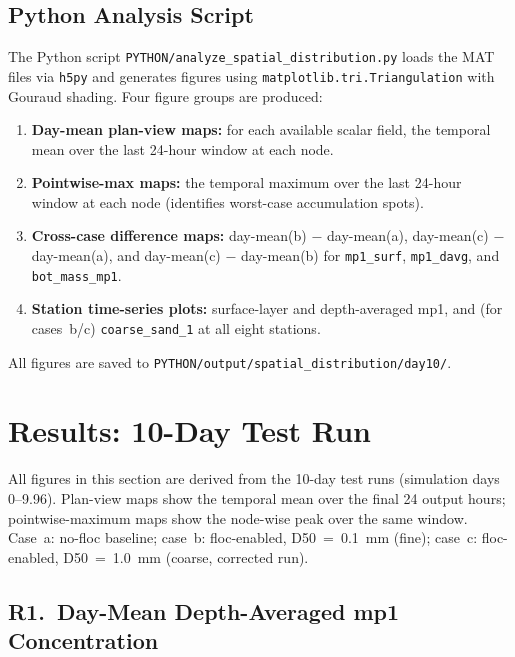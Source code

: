 \documentclass[11pt]{article}
\begin{document}
\subsection*{Python Analysis Script}

The Python script \texttt{PYTHON/analyze\_spatial\_distribution.py} loads
the MAT files via \texttt{h5py} and generates figures using
\texttt{matplotlib.tri.Triangulation} with Gouraud shading.  Four figure
groups are produced:

\begin{enumerate}[(1)]
  \item \textbf{Day-mean plan-view maps:} for each available scalar field,
        the temporal mean over the last 24-hour window at each node.
  \item \textbf{Pointwise-max maps:} the temporal maximum over the last
        24-hour window at each node (identifies worst-case accumulation spots).
  \item \textbf{Cross-case difference maps:} day-mean(b) $-$ day-mean(a),
        day-mean(c) $-$ day-mean(a), and day-mean(c) $-$ day-mean(b) for
        \texttt{mp1\_surf}, \texttt{mp1\_davg}, and \texttt{bot\_mass\_mp1}.
  \item \textbf{Station time-series plots:} surface-layer and depth-averaged
        mp1, and (for cases~b/c) \texttt{coarse\_sand\_1} at all eight stations.
\end{enumerate}

All figures are saved to \texttt{PYTHON/output/spatial\_distribution/day10/}.

\section*{Results: 10-Day Test Run}

All figures in this section are derived from the 10-day test runs
(simulation days 0--9.96).  Plan-view maps show the temporal mean
over the final 24 output hours; pointwise-maximum maps show the
node-wise peak over the same window.
Case~a: no-floc baseline; case~b: floc-enabled, D50~=~0.1~mm (fine);
case~c: floc-enabled, D50~=~1.0~mm (coarse, corrected run).

\subsection*{R1.\ Day-Mean Depth-Averaged mp1 Concentration}
\end{document}
